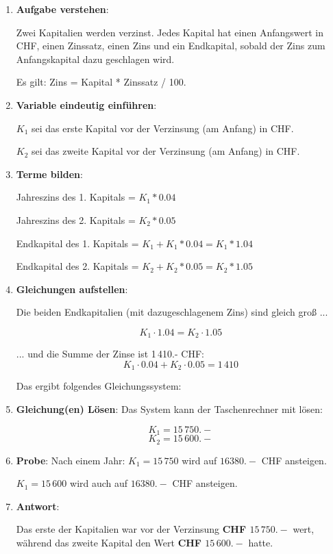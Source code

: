 



\usepackage{cancel}
\renewcommand{\metaHeaderLine}{Lösungsweg (Vorschlag)}
\renewcommand{\arbeitsblattTitel}{Marthaler Algebra S. 157 Aufg. 44.}

\arbeitsblattHeader{}

\begin{enumerate}
\item \textbf{Aufgabe verstehen}:

Zwei Kapitalien werden verzinst. Jedes Kapital hat
einen Anfangswert in CHF, einen Zinssatz, einen Zins und ein
Endkapital, sobald der Zins zum Anfangskapital dazu geschlagen wird.

Es gilt:  Zins = Kapital * Zinssatz / 100.

\item \textbf{Variable eindeutig einführen}:

$K_1$ sei das erste Kapital vor der Verzinsung (am Anfang) in CHF.

$K_2$ sei das zweite Kapital vor der Verzinsung (am Anfang) in CHF.

\item \textbf{Terme bilden}:

Jahreszins des 1. Kapitals = $K_1 * 0.04$

Jahreszins des 2. Kapitals = $K_2 * 0.05$

Endkapital des 1. Kapitals = $K_1 + K_1 * 0.04 = K_1 * 1.04$

Endkapital des 2. Kapitals = $K_2 + K_2 * 0.05 = K_2 * 1.05$

\item \textbf{Gleichungen aufstellen}:

Die beiden Endkapitalien (mit dazugeschlagenem Zins) sind gleich groß ...

$$K_1\cdot{} 1.04 = K_2 \cdot{} 1.05$$

... und die Summe der Zinse ist 1\,410.- CHF:
$$K_1\cdot{} 0.04 + K_2\cdot{} 0.05 = 1\,410$$

Das ergibt folgendes Gleichungssystem:


\item \textbf{Gleichung(en) Lösen}:
Das System kann der Taschenrechner mit  lösen:

$$K_1 = 15\,750.-$$
$$K_2 = 15\,600.-$$

\item \textbf{Probe}:
Nach einem Jahr: $K_1=15\,750$ wird auf $16380.-$ CHF ansteigen.

$K_1=15\,600$ wird auch auf $16380.-$ CHF ansteigen.

\item \textbf{Antwort}:

Das erste der Kapitalien war vor der Verzinsung \textbf{CHF $15\,750.-$}
wert, während das zweite Kapital den Wert \textbf{CHF $15\,600.-$} hatte.
\end{enumerate}


